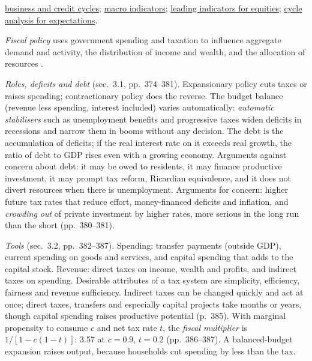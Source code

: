 \begin{qfmethod}
 \hyperref[def:business-credit-cycles]{business and credit cycles}; \hyperref[def:macroeconomic-indicators]{macro indicators}; \hyperref[meth:equity-macro-leading-indicators]{leading indicators for equities}; \hyperref[meth:cycle-policy-curve-expectations]{cycle analysis for expectations}.

\end{qfmethod}

\begin{qfdefinition}\label{def:fiscal-policy-tools-stance}
 \emph{Fiscal policy} uses government spending and taxation to influence aggregate demand and activity, the distribution of income and wealth, and the allocation of resources \citep[chap.~7, sec.~3, p.~374]{economics-investment-decision-makers-2013}.

\emph{Roles, deficits and debt} (sec.~3.1, pp.~374--381). Expansionary policy cuts taxes or raises spending; contractionary policy does the reverse. The budget balance (revenue less spending, interest included) varies automatically: \emph{automatic stabilisers} such as unemployment benefits and progressive taxes widen deficits in recessions and narrow them in booms without any decision. The debt is the accumulation of deficits; if the real interest rate on it exceeds real growth, the ratio of debt to GDP rises even with a growing economy. Arguments against concern about debt: it may be owed to residents, it may finance productive investment, it may prompt tax reform, Ricardian equivalence, and it does not divert resources when there is unemployment. Arguments for concern: higher future tax rates that reduce effort, money-financed deficits and inflation, and \emph{crowding out} of private investment by higher rates, more serious in the long run than the short (pp.~380--381).

\emph{Tools} (sec.~3.2, pp.~382--387). Spending: transfer payments (outside GDP), current spending on goods and services, and capital spending that adds to the capital stock. Revenue: direct taxes on income, wealth and profits, and indirect taxes on spending. Desirable attributes of a tax system are simplicity, efficiency, fairness and revenue sufficiency. Indirect taxes can be changed quickly and act at once; direct taxes, transfers and especially capital projects take months or years, though capital spending raises productive potential (p.~385). With marginal propensity to consume $c$ and net tax rate $t$, the \emph{fiscal multiplier} is $1/[1-c(1-t)]$: 3.57 at $c=0.9$, $t=0.2$ (pp.~386--387). A balanced-budget expansion raises output, because households cut spending by less than the tax.


\end{qfdefinition}
